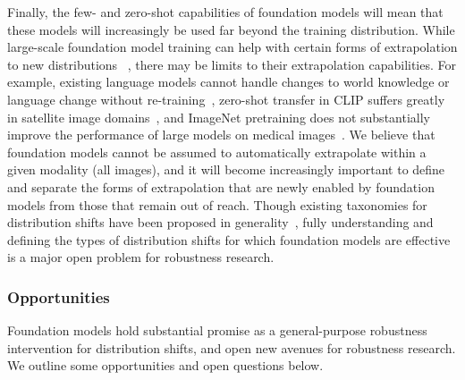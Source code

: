 Finally, the few- and zero-shot capabilities of foundation models will mean that these models will increasingly be used far beyond the training distribution. While large-scale foundation model training can help with certain forms of extrapolation to new distributions ~\citep{papadimitriou2020learning}, there may be limits to their extrapolation capabilities. 
For example, existing language models cannot handle changes to world knowledge or language change without re-training~\citep{lazaridou2021pitfalls,dhingra2021time}, zero-shot transfer in CLIP suffers greatly in satellite image domains~\citep{radford2021learning}, and ImageNet pretraining does not substantially improve the performance of large models on medical images~\citep{raghu2019transfusion,ke2021chextransfer}.
We believe that foundation models cannot be assumed to automatically extrapolate within a given modality (\eg all images), and it will become increasingly important to define and separate the forms of extrapolation that are newly enabled by foundation models from those that remain out of reach.
Though existing taxonomies for distribution shifts have been proposed in generality~\citep{candela2009when,ye2021oodbench},
fully understanding and defining the types of distribution shifts for which foundation models are effective is a major open problem for robustness research.

\subsubsection{Opportunities}
\label{sec:robustness-opportunities}

Foundation models hold substantial promise as a general-purpose robustness intervention for distribution shifts, and open new avenues for robustness research. We outline some opportunities and open questions below.

